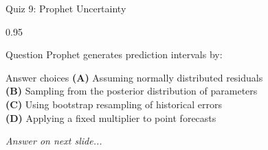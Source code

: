 \documentclass[9pt, aspectratio=169, t]{beamer}
\begin{document}
\begin{frame}{Quiz 9: Prophet Uncertainty}
    \begin{cminipage}{0.95\textwidth}
    \begin{alertblock}{Question}
        Prophet generates prediction intervals by:
    \end{alertblock}

    \vspace{0.4cm}

    \begin{block}{Answer choices}
        \textcolor{MainBlue}{\textbf{(A)}} Assuming normally distributed residuals\\[3pt]
        \textcolor{MainBlue}{\textbf{(B)}} Sampling from the posterior distribution of parameters\\[3pt]
        \textcolor{MainBlue}{\textbf{(C)}} Using bootstrap resampling of historical errors\\[3pt]
        \textcolor{MainBlue}{\textbf{(D)}} Applying a fixed multiplier to point forecasts
    \end{block}

    \vspace{0.5cm}

    \begin{center}
        \textit{Answer on next slide...}
    \end{center}
    \end{cminipage}
\end{frame}
\end{document}
